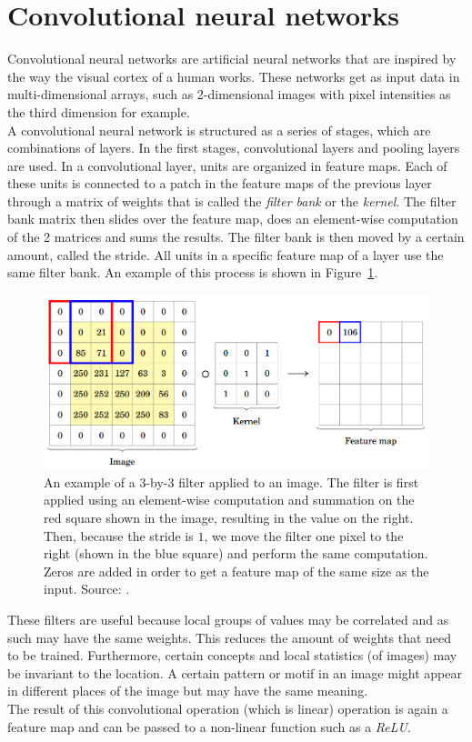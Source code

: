 \section{Convolutional neural networks}
Convolutional neural networks are artificial neural networks that are inspired by the way the visual cortex of a human works.
These networks get as input data in multi-dimensional arrays, such as 2-dimensional images with pixel intensities as the third dimension for example.\\
A convolutional neural network is structured as a series of stages, which are combinations of layers.
In the first stages, convolutional layers and pooling layers are used.
In a convolutional layer, units are organized in feature maps.
Each of these units is connected to a patch in the feature maps of the previous layer through a matrix of weights that is called the \emph{filter bank} or the \textit{kernel}.
The filter bank matrix then slides over the feature map, does an element-wise computation of the 2 matrices and sums the results.
The filter bank is then moved by a certain amount, called the stride.
All units in a specific feature map of a layer use the same filter bank.
An example of this process is shown in Figure~\ref{fig:cnnfilter}.
\begin{figure}[htb]
    \centering
    \includegraphics[width=.8\linewidth]{images/cnnfilter.png}
    \caption[An example of a 3-by-3 filter applied to an image]{An example of a 3-by-3 filter applied to an image. The filter is first applied using an element-wise computation and summation on the red square shown in the image, resulting in the value on the right. Then, because the stride is $1$, we move the filter one pixel to the right (shown in the blue square) and perform the same computation. Zeros are added in order to get a feature map of the same size as the input. Source: \cite{pavlovsky2017}.}
    \label{fig:cnnfilter}
\end{figure}

These filters are useful because local groups of values may be correlated and as such may have the same weights. This reduces the amount of weights that need to be trained. Furthermore, certain concepts and local statistics (of images) may be invariant to the location. A certain pattern or motif in an image might appear in different places of the image but may have the same meaning.\\
The result of this convolutional operation (which is linear) operation is again a feature map and can be passed to a non-linear function such as a \textit{ReLU}.\\

